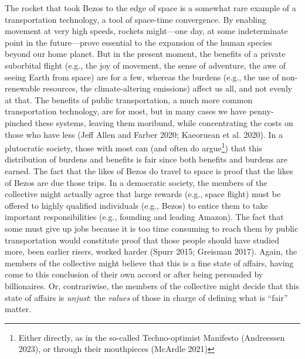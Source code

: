 \documentclass[12pt, oneside]{report}
\begin{document}
The rocket that took Bezos to the edge of space is a somewhat rare
example of a transportation technology, a tool of space-time
convergence. By enabling movement at very high speeds, rockets
might---one day, at some indeterminate point in the future---prove
essential to the expansion of the human species beyond our home planet.
But in the present moment, the benefits of a private suborbital flight
(e.g., the joy of movement, the sense of adventure, the awe of seeing
Earth from space) are for a few, whereas the burdens (e.g., the use of
non-renewable resources, the climate-altering emissions) affect us all,
and not evenly at that. The benefits of public transportation, a much
more common transportation technology, are for most, but in many cases
we have penny-pinched these systems, leaving them moribund, while
concentrating the costs on those who have less (Jeff Allen and Farber
2020; Kaeoruean et al. 2020). In a plutocratic society, those with most
can (and often do argue\footnote{Either directly, as in the so-called
  Techno-optimist Manifesto (Andreessen 2023), or through their
  mouthpieces (McArdle 2021)}) that this distribution of burdens and
benefits is fair since both benefits and burdens are earned. The fact
that the likes of Bezos do travel to space is proof that the likes of
Bezos are due those trips. In a democratic society, the members of the
collective might actually agree that large rewards (e.g., space flight)
must be offered to highly qualified individuals (e.g., Bezos) to entice
them to take important responsibilities (e.g., founding and leading
Amazon). The fact that some must give up jobs because it is too time
consuming to reach them by public transportation would constitute proof
that those people should have studied more, been earlier risers, worked
harder (Spurr 2015; Greisman 2017). Again, the members of the collective
might believe that this is a fine state of affairs, having come to this
conclusion of their own accord or after being persuaded by billionaires.
Or, contrariwise, the members of the collective might decide that this
state of affairs is \emph{unjust}: the \emph{values} of those in charge
of defining what is ``fair'' matter.
\end{document}
